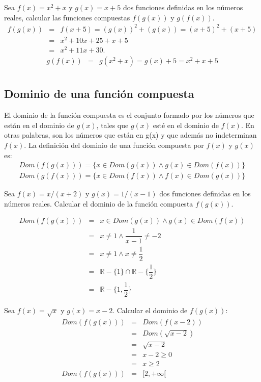 \begin{myexample}
Sea $f(x)=x^{2} +x$ y $g(x)=x+5$ dos funciones definidas en los números reales, calcular las funciones compuestas $f(g(x))$ y $g(f(x))$.\\
\begin{eqnarray*}
f(g(x))&=& f(x+5)= (g(x))^{2}+(g(x))=(x+5)^{2}+(x+5)\\
&=& x^{2}+10x+25+x+5\\
&=&x^{2}+11x+30.
\end{eqnarray*}
\begin{eqnarray*}
g(f(x))&=& g(x^{2}+x)=g(x)+5=x^{2}+x+5 \\
\end{eqnarray*}
\end{myexample}


\subsection{Dominio de una función compuesta}
El dominio de la función compuesta es el conjunto formado por los números que están en el dominio de $g(x)$, tales que $g(x)$ esté en el dominio de $f(x)$. En otras palabras, son los números que están en g(x) y que además no indeterminan $f(x)$. La definición del dominio de una función compuesta por $f(x)$ y $g(x)$ es:
\begin{eqnarray}
Dom\left(f(g(x)) \right)=\{x\in Dom(g(x))\wedge g(x)\in Dom(f(x))\}\\
Dom\left(g(f(x)) \right)=\{x\in Dom(f(x))\wedge f(x)\in Dom(g(x))\}
\end{eqnarray}

\begin{myexample}
Sea $f(x)=x/(x+2)$ y $g(x)=1/(x-1)$ dos funciones definidas en los números reales. Calcular el dominio de la función compuesta $f(g(x))$.

\begin{eqnarray*}
Dom(f(g(x)))&=& x\in Dom(g(x)) \wedge g(x)\in Dom(f(x))\\
&=& x\neq 1 \wedge \dfrac{1}{x-1}\neq -2\\
&=& x\neq 1 \wedge x\neq\dfrac{1}{2}\\
&=& \mathbb{R}-\{1\} \cap \mathbb{R}-\biggl\{\dfrac{1}{2}\biggl\}\\
&=&\mathbb{R}-\biggl\{ 1,\dfrac{1}{2}\biggl\}
\end{eqnarray*}
\end{myexample}

\begin{myexample}
Sea $f(x)=\sqrt{x}$ y $g(x)=x-2$. Calcular el dominio de $f(g(x))$:\\
\begin{eqnarray*}
Dom(f(g(x)))&=& Dom(f(x-2))\\
&=& Dom(\sqrt{x-2})\\
&=& \sqrt{x-2}\\
&=& x-2\geq 0\\
&=& x\geq 2\\
Dom(f(g(x)))&=& [2,+\infty [ \\
\end{eqnarray*}
\end{myexample}

